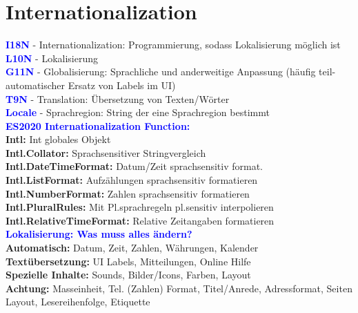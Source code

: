 
\section{Internationalization}


\textbf{\textcolor{blue}{I18N}} - Internationalization: Programmierung, sodass Lokalisierung möglich ist\\
\textbf{\textcolor{blue}{L10N}} - Lokalisierung\\
\textbf{\textcolor{blue}{G11N}} - Globalisierung: Sprachliche und anderweitige Anpassung (häufig teil-automatischer Ersatz von Labels im UI)\\
\textbf{\textcolor{blue}{T9N}} - Translation: Übersetzung von Texten/Wörter\\
\textbf{\textcolor{blue}{Locale}} - Sprachregion: String der eine Sprachregion bestimmt\\
\textbf{\textcolor{blue}{ES2020 Internationalization Function:}}\\
\textbf{Intl:} Int globales Objekt\\
\textbf{Intl.Collator:} Sprachsensitiver Stringvergleich\\
\textbf{Intl.DateTimeFormat:} Datum/Zeit sprachsensitiv format.\\
\textbf{Intl.ListFormat:} Aufzählungen sprachsensitiv formatieren\\
\textbf{Intl.NumberFormat:} Zahlen sprachsensitiv formatieren\\
\textbf{Intl.PluralRules:} Mit Pl.sprachregeln pl.sensitiv interpolieren\\
\textbf{Intl.RelativeTimeFormat:} Relative Zeitangaben formatieren\\
\textbf{\textcolor{blue}{Lokalisierung: Was muss alles ändern?}}\\
\textbf{Automatisch:} Datum, Zeit, Zahlen, Währungen, Kalender\\
\textbf{Textübersetzung:} UI Labels, Mitteilungen, Online Hilfe\\
\textbf{Spezielle Inhalte:} Sounds, Bilder/Icons, Farben, Layout\\
\textbf{Achtung:} Masseinheit, Tel. (Zahlen) Format, Titel/Anrede, Adressformat, Seiten Layout, Lesereihenfolge, Etiquette